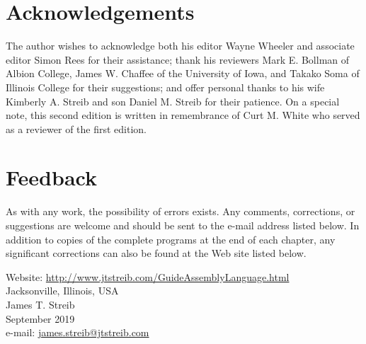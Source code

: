 \documentclass[10pt]{book}
\begin{document}
\section{Acknowledgements}
The author wishes to acknowledge both his editor Wayne Wheeler and associate editor Simon Rees for their assistance; thank his reviewers Mark E. Bollman of Albion College, James W. Chaffee of the University of Iowa, and Takako Soma of Illinois College for their suggestions; and offer personal thanks to his wife Kimberly A. Streib and son Daniel M. Streib for their patience. On a special note, this second edition is written in remembrance of Curt M. White who served as a reviewer of the first edition.

\section{Feedback}
As with any work, the possibility of errors exists. Any comments, corrections, or suggestions are welcome and should be sent to the e-mail address listed below. In addition to copies of the complete programs at the end of each chapter, any significant corrections can also be found at the Web site listed below.


Website: \href{http://www.jtstreib.com/GuideAssemblyLanguage.html}{http://www.jtstreib.com/GuideAssemblyLanguage.html}\\
Jacksonville, Illinois, USA\\
James T. Streib\\
September 2019\\
e-mail: \href{mailto:james.streib@jtstreib.com}{james.streib@jtstreib.com}
\end{document}
